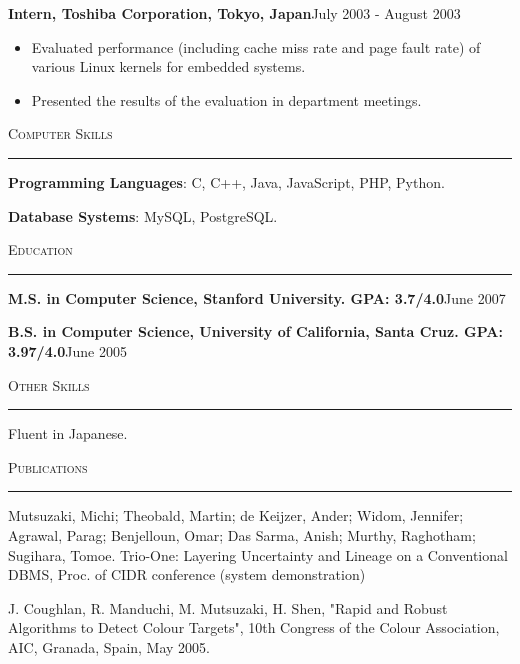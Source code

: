 \documentclass[10pt]{article}
\newcommand{\HRule}{\noindent\rule{\linewidth}{0.1mm}}
\newcommand{\header}[1]{\vspace{0.4cm}\noindent\textsc{\large{#1}}\vspace{-0.2cm}\newline\HRule}
\newcommand{\subheader}[2]{\noindent \textbf{#1}\hspace{\stretch{1}}#2}
\begin{document}
\subheader{Intern, Toshiba Corporation, Tokyo, Japan}{July 2003 - August 2003}

\noindent
\begin{itemize}
\item Evaluated performance (including cache miss rate and page fault rate) 
of various Linux kernels for embedded systems.
\item Presented the results of the evaluation in department meetings. 
\end{itemize}

\header{Computer Skills} 

\noindent\textbf{Programming Languages}: C, C++, Java, JavaScript, PHP, Python. 

\noindent\textbf{Database Systems}: MySQL, PostgreSQL. 


\header{Education}
\subheader{M.S. in Computer Science, Stanford University. GPA: 3.7/4.0}{June 2007}

\subheader{B.S. in Computer Science, University of California, Santa Cruz. GPA: 3.97/4.0}{June 2005} 

\header{Other Skills}
Fluent in Japanese. 

\header{Publications}
Mutsuzaki, Michi; Theobald, Martin; de Keijzer, Ander; Widom, Jennifer; 
Agrawal, Parag; Benjelloun, Omar; Das Sarma, Anish; Murthy, Raghotham; 
Sugihara, Tomoe. Trio-One: Layering Uncertainty and Lineage on a 
Conventional DBMS, Proc. of CIDR conference (system demonstration)
\newline

\noindent
J. Coughlan, R. Manduchi, M. Mutsuzaki, H. Shen, "Rapid and Robust
Algorithms to Detect Colour Targets", 10th Congress of the Colour 
Association, AIC, Granada, Spain, May 2005.
\end{document}
